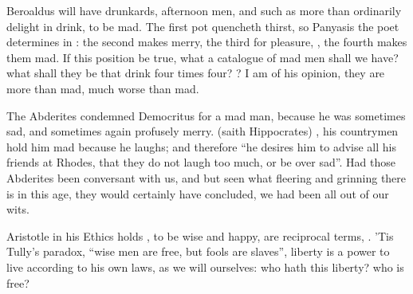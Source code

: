 Beroaldus will have drunkards, afternoon men, and such as more than ordinarily
delight in drink, to be mad. The first pot quencheth thirst, so Panyasis the
poet determines in : the
second makes merry, the third for pleasure, , the
fourth makes them mad. If this position be true, what a catalogue of mad men
shall we have? what shall they be that drink four times four? ? I am of his opinion,
they are more than mad, much worse than mad.

The Abderites condemned Democritus for a mad man, because
he was sometimes sad, and sometimes again profusely merry. 
(saith Hippocrates) , his countrymen
hold him mad because he laughs; and therefore \enquote{he desires
him to advise all his friends at Rhodes, that they do not laugh too much, or be
over sad}. Had those Abderites been conversant with us, and but seen what
fleering and grinning there is in this age, they would
certainly have concluded, we had been all out of our wits.

Aristotle in his Ethics holds , to be wise and happy,
are reciprocal terms, . 'Tis
Tully's paradox, \enquote{wise men are free, but fools are slaves},
liberty is a power to live according to his own laws, as we will ourselves: who
hath this liberty? who is free?


